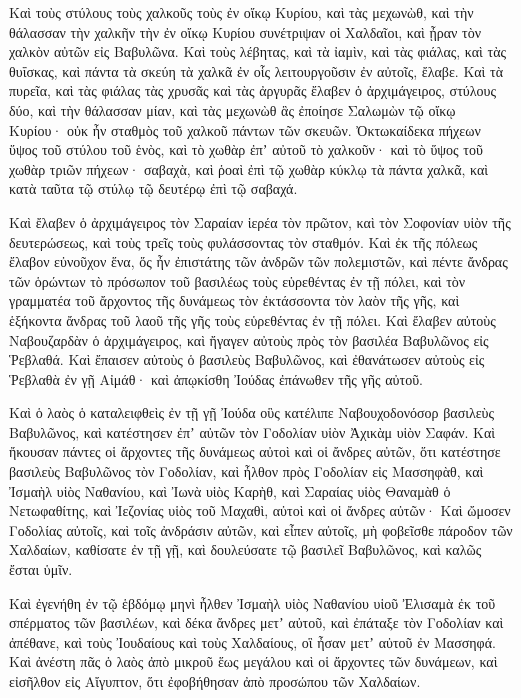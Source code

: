{\par }{\PP {}Καὶ τοὺς στύλους τοὺς χαλκοῦς τοὺς ἐν οἴκῳ Κυρίου, καὶ τὰς μεχωνὼθ, καὶ τὴν θάλασσαν τὴν χαλκῆν τὴν ἐν οἴκῳ Κυρίου συνέτριψαν οἱ Χαλδαῖοι, καὶ ᾖραν τὸν χαλκὸν αὐτῶν εἰς Βαβυλῶνα.
Καὶ τοὺς λέβητας, καὶ τὰ ἰαμὶν, καὶ τὰς φιάλας, καὶ τὰς θυΐσκας, καὶ πάντα τὰ σκεύη τὰ χαλκᾶ ἐν οἷς λειτουργοῦσιν ἐν αὐτοῖς, ἔλαβε.
Καὶ τὰ πυρεῖα, καὶ τὰς φιάλας τὰς χρυσᾶς καὶ τὰς ἀργυρᾶς ἔλαβεν ὁ ἀρχιμάγειρος,
στύλους δύο, καὶ τὴν θάλασσαν μίαν, καὶ τὰς μεχωνὼθ ἃς ἐποίησε Σαλωμὼν τῷ οἴκῳ Κυρίου· οὐκ ἦν σταθμὸς τοῦ χαλκοῦ πάντων τῶν σκευῶν.
Ὀκτωκαίδεκα πήχεων ὕψος τοῦ στύλου τοῦ ἑνὸς, καὶ τὸ χωθὰρ ἐπʼ αὐτοῦ τὸ χαλκοῦν· καὶ τὸ ὕψος τοῦ χωθὰρ τριῶν πήχεων· σαβαχὰ, καὶ ῥοαὶ ἐπὶ τῷ χωθὰρ κύκλῳ τὰ πάντα χαλκᾶ, καὶ κατὰ ταῦτα τῷ στύλῳ τῷ δευτέρῳ ἐπὶ τῷ σαβαχά.
\par }{\PP {}Καὶ ἔλαβεν ὁ ἀρχιμάγειρος τὸν Σαραίαν ἱερέα τὸν πρῶτον, καὶ τὸν Σοφονίαν υἱὸν τῆς δευτερώσεως, καὶ τοὺς τρεῖς τοὺς φυλάσσοντας τὸν σταθμόν.
Καὶ ἐκ τῆς πόλεως ἔλαβον εὐνοῦχον ἕνα, ὅς ἦν ἐπιστάτης τῶν ἀνδρῶν τῶν πολεμιστῶν, καὶ πέντε ἄνδρας τῶν ὁρώντων τὸ πρόσωπον τοῦ βασιλέως τοὺς εὑρεθέντας ἐν τῇ πόλει, καὶ τὸν γραμματέα τοῦ ἄρχοντος τῆς δυνάμεως τὸν ἐκτάσσοντα τὸν λαὸν τῆς γῆς, καὶ ἑξήκοντα ἄνδρας τοῦ λαοῦ τῆς γῆς τοὺς εὑρεθέντας ἐν τῇ πόλει.
Καὶ ἔλαβεν αὐτοὺς Ναβουζαρδὰν ὁ ἀρχιμάγειρος, καὶ ἤγαγεν αὐτοὺς πρὸς τὸν βασιλέα Βαβυλῶνος εἰς Ῥεβλαθά.
Καὶ ἔπαισεν αὐτοὺς ὁ βασιλεὺς Βαβυλῶνος, καὶ ἐθανάτωσεν αὐτοὺς εἰς Ῥεβλαθὰ ἐν γῇ Αἰμάθ· καὶ ἀπῳκίσθη Ἰούδας ἐπάνωθεν τῆς γῆς αὐτοῦ.
\par }{\PP {}Καὶ ὁ λαὸς ὁ καταλειφθεὶς ἐν τῇ γῇ Ἰούδα οὓς κατέλιπε Ναβουχοδονόσορ βασιλεὺς Βαβυλῶνος, καὶ κατέστησεν ἐπʼ αὐτῶν τὸν Γοδολίαν υἱὸν Ἀχικὰμ υἱὸν Σαφάν.
Καὶ ἤκουσαν πάντες οἱ ἄρχοντες τῆς δυνάμεως αὐτοὶ καὶ οἱ ἄνδρες αὐτῶν, ὅτι κατέστησε βασιλεὺς Βαβυλῶνος τὸν Γοδολίαν, καὶ ἦλθον πρὸς Γοδολίαν εἰς Μασσηφὰθ, καὶ Ἰσμαὴλ υἱὸς Ναθανίου, καὶ Ἰωνὰ υἱὸς Καρὴθ, καὶ Σαραίας υἱὸς Θαναμὰθ ὁ Νετωφαθίτης, καὶ Ἰεζονίας υἱὸς τοῦ Μαχαθὶ, αὐτοὶ καὶ οἱ ἄνδρες αὐτῶν·
Καὶ ὤμοσεν Γοδολίας αὐτοῖς, καὶ τοῖς ἀνδράσιν αὐτῶν, καὶ εἶπεν αὐτοῖς, μὴ φοβεῖσθε πάροδον τῶν Χαλδαίων, καθίσατε ἐν τῇ γῇ, καὶ δουλεύσατε τῷ βασιλεῖ Βαβυλῶνος, καὶ καλῶς ἔσται ὑμῖν.
\par }{\PP {}Καὶ ἐγενήθη ἐν τῷ ἑβδόμῳ μηνὶ ἦλθεν Ἰσμαὴλ υἱὸς Ναθανίου υἱοῦ Ἐλισαμὰ ἐκ τοῦ σπέρματος τῶν βασιλέων, καὶ δέκα ἄνδρες μετʼ αὐτοῦ, καὶ ἐπάταξε τὸν Γοδολίαν καὶ ἀπέθανε, καὶ τοὺς Ἰουδαίους καὶ τοὺς Χαλδαίους, οἳ ἦσαν μετʼ αὐτοῦ ἐν Μασσηφά.
Καὶ ἀνέστη πᾶς ὁ λαὸς ἀπὸ μικροῦ ἕως μεγάλου καὶ οἱ ἄρχοντες τῶν δυνάμεων, καὶ εἰσῆλθον εἰς Αἴγυπτον, ὅτι ἐφοβήθησαν ἀπὸ προσώπου τῶν Χαλδαίων.
}
